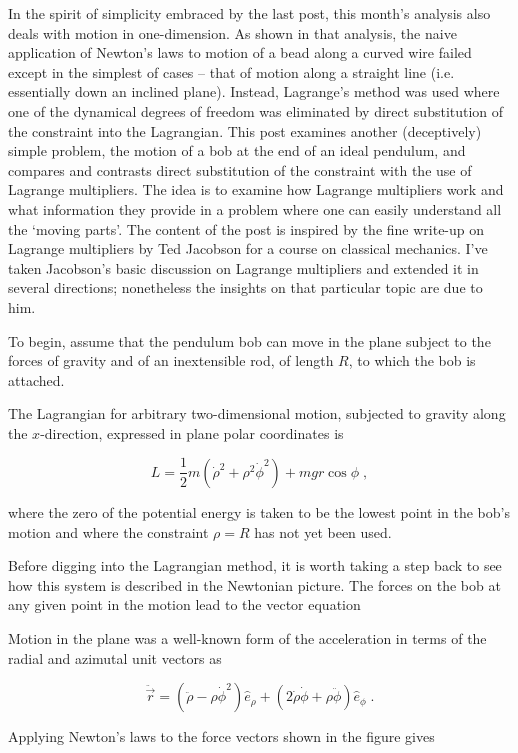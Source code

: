 \documentclass[12pt]{article}
\begin{document}
In the spirit of simplicity embraced by the last post, this month’s analysis also deals with motion in one-dimension.  As shown in that analysis, the naive application of Newton's laws to motion of a bead along a curved wire failed except in the simplest of cases – that of motion along a straight line (i.e. essentially down an inclined plane).  Instead, Lagrange’s method was used where one of the dynamical degrees of freedom was eliminated by direct substitution of the constraint into the Lagrangian.   This post examines another (deceptively) simple problem, the motion of a bob at the end of an ideal pendulum, and compares and contrasts direct substitution of the constraint with the use of Lagrange multipliers.  The idea is to examine how Lagrange multipliers work and what information they provide in a problem where one can easily understand all the ‘moving parts’.   The content of the post is inspired by the fine write-up on Lagrange multipliers by Ted Jacobson for a course on classical mechanics.  I've taken Jacobson's basic discussion on Lagrange multipliers and extended it in several directions; nonetheless the insights on that particular topic are due to him.

To begin, assume that the pendulum bob can move in the plane subject to the forces of gravity and of an inextensible rod, of length $R$, to which the bob is attached.
 
The Lagrangian for arbitrary two-dimensional motion, subjected to gravity along the $x$-direction, expressed in plane polar coordinates is

\[ L = \frac{1}{2} m \left( \dot \rho^2 + \rho^2 \dot \phi^2 \right) + m g r \cos \phi \; , \]

where the zero of the potential energy is taken to be the lowest point in the bob's motion and where the constraint $\rho = R$ has not yet been used.

Before digging into the Lagrangian method, it is worth taking a step back to see how this system is described in the Newtonian picture.  The forces on the bob at any given point in the motion lead to the vector equation

Motion in the plane was a well-known form of the acceleration in terms of the radial and azimutal unit vectors as

\[ \ddot {\vec r} = (\ddot \rho - \rho \dot \phi^2) \hat e_{\rho} + (2 \dot \rho \dot \phi + \rho \ddot \phi) \hat e_{\phi} \; .  \] 

Applying Newton's laws to the force vectors shown in the figure gives
\end{document}
